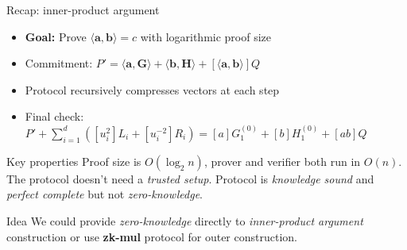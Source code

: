 \documentclass{zkdl-presentation-template}
\begin{document}
    \begin{frame}{Recap: inner-product argument}
        \begin{itemize}
            \item \textbf{Goal:} Prove $\langle \mathbf{a}, \mathbf{b} \rangle = c$ with logarithmic proof size
            \item Commitment: $P' = \langle \mathbf{a}, \mathbf{G} \rangle + \langle \mathbf{b}, \mathbf{H} \rangle + [\langle \mathbf{a,b} \rangle]Q$
            \item Protocol recursively compresses vectors at each step
            \item Final check: $P' + \sum_{i=1}^d ([u_i^2]L_i + [u_i^{-2}]R_i) = [a]G_1^{(0)} + [b]H_1^{(0)} + [ab]Q$
        \end{itemize}
        \pause
        \begin{alertblock}{Key properties}
            Proof size is $O(\log_2 n)$, prover and verifier both run in $O(n)$. The protocol doesn't need a \textit{trusted setup}. Protocol is \textit{knowledge sound} and \textit{perfect complete} but not \textit{zero-knowledge}.
        \end{alertblock}
        \pause
        \begin{block}{Idea}
            We could provide \textit{zero-knowledge} directly to \textit{inner-product argument} construction or use \textbf{zk-mul} protocol for outer construction.
        \end{block}
    \end{frame}
\end{document}
